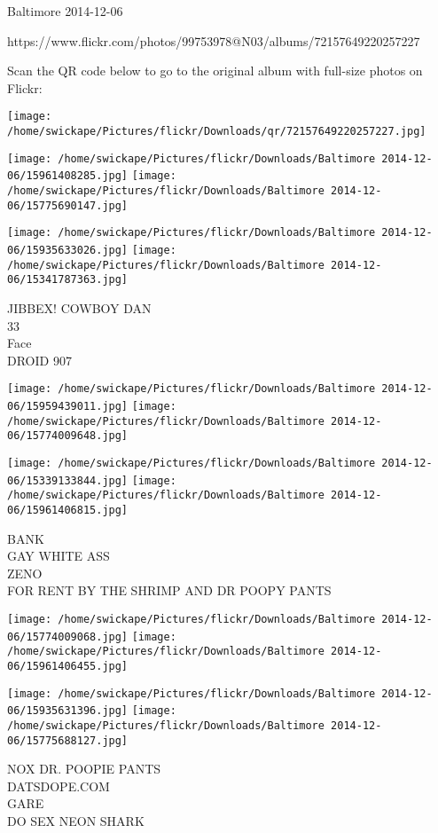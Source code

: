 \documentclass[10pt,letterpaper]{article}
\begin{document}
Baltimore 2014-12-06

https://www.flickr.com/photos/99753978@N03/albums/72157649220257227

Scan the QR code below to go to the original album with full-size photos on Flickr:

\texttt{[image: /home/swickape/Pictures/flickr/Downloads/qr/72157649220257227.jpg]}
\pagebreak

\texttt{[image: /home/swickape/Pictures/flickr/Downloads/Baltimore 2014-12-06/15961408285.jpg]}
\texttt{[image: /home/swickape/Pictures/flickr/Downloads/Baltimore 2014-12-06/15775690147.jpg]}

\texttt{[image: /home/swickape/Pictures/flickr/Downloads/Baltimore 2014-12-06/15935633026.jpg]}
\texttt{[image: /home/swickape/Pictures/flickr/Downloads/Baltimore 2014-12-06/15341787363.jpg]}

JIBBEX! COWBOY DAN\\
33\\
Face\\
DROID 907\\
\pagebreak

\texttt{[image: /home/swickape/Pictures/flickr/Downloads/Baltimore 2014-12-06/15959439011.jpg]}
\texttt{[image: /home/swickape/Pictures/flickr/Downloads/Baltimore 2014-12-06/15774009648.jpg]}

\texttt{[image: /home/swickape/Pictures/flickr/Downloads/Baltimore 2014-12-06/15339133844.jpg]}
\texttt{[image: /home/swickape/Pictures/flickr/Downloads/Baltimore 2014-12-06/15961406815.jpg]}

BANK\\
GAY WHITE ASS\\
ZENO\\
FOR RENT BY THE SHRIMP AND DR POOPY PANTS\\
\pagebreak

\texttt{[image: /home/swickape/Pictures/flickr/Downloads/Baltimore 2014-12-06/15774009068.jpg]}
\texttt{[image: /home/swickape/Pictures/flickr/Downloads/Baltimore 2014-12-06/15961406455.jpg]}

\texttt{[image: /home/swickape/Pictures/flickr/Downloads/Baltimore 2014-12-06/15935631396.jpg]}
\texttt{[image: /home/swickape/Pictures/flickr/Downloads/Baltimore 2014-12-06/15775688127.jpg]}

NOX DR. POOPIE PANTS\\
DATSDOPE.COM\\
GARE\\
DO SEX NEON SHARK\\
\pagebreak
\end{document}
